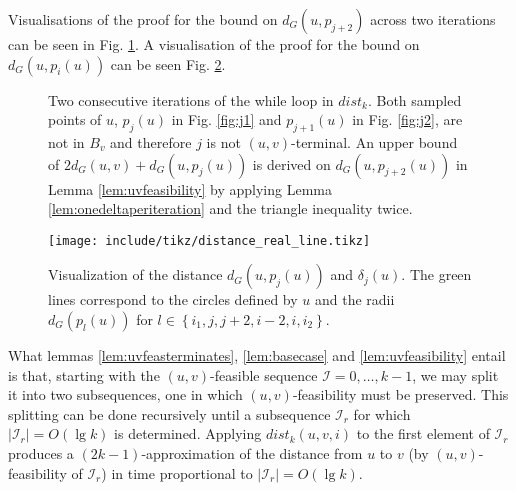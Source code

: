 \documentclass[12pt]{article}
\begin{document}
Visualisations of the proof for the bound on $d_G(u,p_{j+2})$ across two iterations can be seen in Fig. \ref{fig:twoiterations}. A visualisation of the proof for the bound on $d_G(u,p_i(u))$ can be seen Fig. \ref{fig:realline}.

\begin{figure}[!hbt]
  \centering
  \hfill
  \caption{Two consecutive iterations of the while loop in $dist_k$. Both sampled points of $u$, $p_j(u)$ in Fig. \ref{fig:j1} and $p_{j+1}(u)$ in Fig. \ref{fig:j2}, are not in $B_v$ and therefore $j$ is not $(u,v)$-terminal. An upper bound of $2d_{G}(u,v)+d_G(u,p_j(u))$ is derived on $d_G(u,p_{j+2}(u))$ in Lemma \ref{lem:uvfeasibility} by applying Lemma \ref{lem:onedeltaperiteration} and the triangle inequality twice. \label{fig:twoiterations}}
\end{figure}

\begin{figure}
\centering
    \texttt{[image: include/tikz/distance\_real\_line.tikz]}%
\caption{Visualization of the distance $d_G(u,p_j(u))$ and $\delta_j(u)$. The green lines correspond to the circles defined by $u$ and the radii $d_G(p_l(u))$ for $l \in \left\{ i_1, j, j+2, i-2, i, i_2 \right\}$. \label{fig:realline}}
\end{figure}

What lemmas \ref{lem:uvfeasterminates}, \ref{lem:basecase} and \ref{lem:uvfeasibility} entail is that, starting with the $(u,v)$-feasible sequence $\mathcal{I}=0,\hdots,k-1$, we may split it into two subsequences, one in which $(u,v)$-feasibility must be preserved. This splitting can be done recursively until a subsequence $\mathcal{I}_r$ for which $|\mathcal{I}_r|=O(\lg k)$ is determined. Applying $dist_k(u,v,i)$ to the first element of $\mathcal{I}_r$ produces a $(2k-1)$-approximation of the distance from $u$ to $v$ (by $(u,v)$-feasibility of $\mathcal{I}_r$) in time proportional to $|\mathcal{I}_r|=O(\lg k)$.
\end{document}
